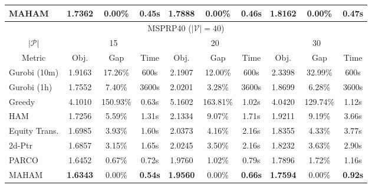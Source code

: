 \begin{table*}[t]
{{\begin{tabular}{lccc|ccc|ccc}
\multicolumn{1}{l|}{MAHAM}                  & \textbf{1.7362} & 0.00\% & \textbf{0.45s} & \textbf{1.7888} & 0.00\% & \textbf{0.46s} & \textbf{1.8162} & 0.00\% & \textbf{0.47s} \\
\midrule[0.5mm]
\multicolumn{10}{c}{MSPRP40 ($|\mathcal{V}|=40$)}  \\ \hline  
\multicolumn{1}{c|}{$|\mathcal{P}|$}        & \multicolumn{3}{c|}{15} & \multicolumn{3}{c|}{20} & \multicolumn{3}{c}{30} \\ \hline
\multicolumn{1}{c|}{Metric} & Obj.          & Gap & \multicolumn{1}{c|}{Time} & Obj. & Gap & \multicolumn{1}{c|}{Time} & Obj. & Gap & \multicolumn{1}{c}{Time} \\ \hline
\multicolumn{1}{l|}{Gurobi (10m)}           & 1.9163            & 17.26\%       & 600s          & 2.1907            & 12.00\%            & 600s             & 2.3398            & 32.99\%       & 600s \\
\multicolumn{1}{l|}{Gurobi (1h)}            & 1.7552            & 7.40\%        & 3600s          & 2.0201           & 3.28\%            & 3600s                & 1.8699         & 6.28\%        & 3600s \\
\multicolumn{1}{l|}{Greedy}                 & 4.1010            & 150.93\%      & 0.63s          & 5.1602            & 163.81\%          & 1.02s               & 4.0420         & 129.74\%      & 1.12s \\ \hline
\multicolumn{1}{l|}{HAM}                    & 1.7256            & 5.59\%        & 1.31s           & 2.1334           & 9.07\%           & 1.71s                & 1.9211       & 9.19\%          & 3.66s \\
\multicolumn{1}{l|}{Equity Trans.}          & 1.6985            & 3.93\%        & 1.60s          & 2.0373          & 4.16\%             & 2.16s               & 1.8355       & 4.33\%           & 3.77s     \\
\multicolumn{1}{l|}{2d-Ptr}                 & 1.6857            & 3.15\%        & 1.65s          & 2.0245          & 3.50\%             & 2.16s               & 1.8232       & 3.63\%           & 2.90s     \\
\multicolumn{1}{l|}{PARCO}                  & 1.6452            & 0.67\%        & 0.72s          & 1.9760          & 1.02\%             & 0.79s               & 1.7896       & 1.72\%           & 1.16s     \\
\multicolumn{1}{l|}{MAHAM}                  & \textbf{1.6343} & 0.00\% & \textbf{0.54s} & \textbf{1.9560} & 0.00\% & \textbf{0.66s} & \textbf{1.7594} & 0.00\%   & \textbf{0.92s}     \\
\bottomrule[0.5mm]
\end{tabular}
}}
\label{tab:main}
\end{table*}